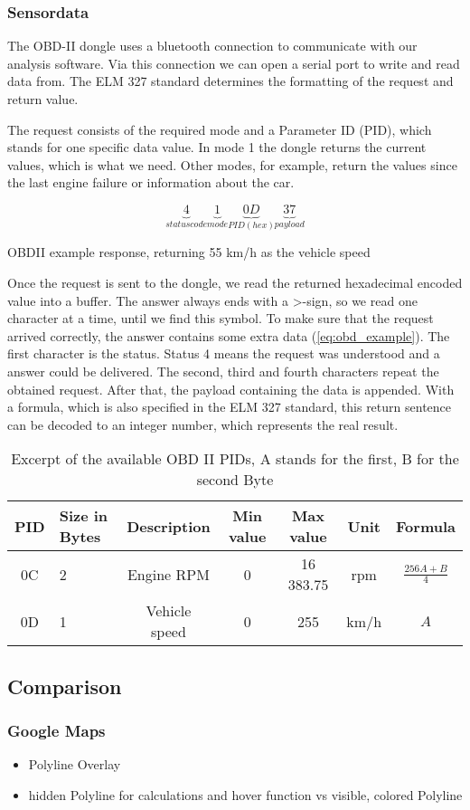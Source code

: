 \subsubsection{Sensordata}
The OBD-II dongle uses a bluetooth connection to communicate with our analysis software. Via this connection we can open a serial port to write and read data from.
The ELM 327 standard determines the formatting of the request and return value.

The request consists of the required mode and a Parameter ID (PID), which stands for one specific data value. In mode 1 the dongle returns the current values, which is what we need. Other modes, for example, return the values since the last engine failure or information about the car.

\begin{equation}
	\label{eq:obd_example}
		\underbrace{4}_{status code}
		\underbrace{1}_{mode}
		\underbrace{0D}_{PID (hex)}
		\underbrace{37}_{payload}
\end{equation}
\begin{center}
	OBDII example response, returning 55 km/h as the vehicle speed
\end{center}

Once the request is sent to the dongle, we read the returned hexadecimal encoded value into a buffer. The answer always ends with a >-sign, so we read one character at a time, until we find this symbol. To make sure that the request arrived correctly, the answer contains some extra data (\ref{eq:obd_example}). The first character is the status. Status 4 means the request was understood and a answer could be delivered. The second, third and fourth characters repeat the obtained request. After that, the payload containing the data is appended. With a formula, which is also specified in the ELM 327 standard, this return sentence can be decoded to an integer number, which represents the real result.

\begin{table}[!ht]
	\begin{center}
		\begin{tabularx}{\textwidth}{|c | X | c | c | c | c | c |}
			\hline
			PID & Size in Bytes & Description & Min value & Max value & Unit & Formula\\ \hline
			0C & 2 & Engine RPM & 0 & 16 383.75 & rpm & $\frac{256A + B}{4}$\\ \hline
			0D & 1 & Vehicle speed & 0 & 255 & km/h & $A$\\ \hline
		\end{tabularx}
	\end{center}
	\caption{Excerpt of the available OBD II PIDs, A stands for the first, B for the second Byte}
\end{table}

\subsection{Comparison}
\subsubsection{Google Maps}
\begin{itemize}
	\item Polyline Overlay
	\item hidden Polyline for calculations and hover function vs visible, colored Polyline	
\end{itemize}
\clearpage